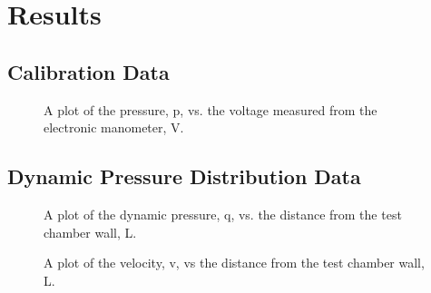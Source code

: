 \chapter{Results}
\label{cp:results}

\section{Calibration Data}\label{sec:calibration_data}



\begin{figure}[htpb]
    \centering
    
    \caption[Plot of pressure vs. voltage measured from the electronic manometer.]{A plot of the pressure, \gls{p}, vs. the voltage measured from the electronic manometer, \gls{V}.}
    \label{fig:pressure_vs_voltage}
\end{figure}

\section{Dynamic Pressure Distribution Data}\label{sec:dynamic_pressure_data}

\begin{figure}[htpb]
    \centering
    
    \caption[Plot of dynamic pressure vs. the distance from the test chamber wall.]{A plot of the dynamic pressure, \gls{q}, vs. the distance from the test chamber wall, \gls{L}.}
    \label{fig:dynamic_pressure_vs_distance}
\end{figure}

\begin{figure}[htpb]
    \centering
    
    \caption[Plot of velocity vs. the distance from the test chamber wall.]{A plot of the velocity, \gls{v}, vs the distance from the test chamber wall, \gls{L}.}
    \label{fig:velocity_vs_distance}
\end{figure}